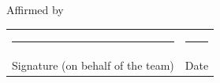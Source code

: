 \begin{center}
\begin{tcolorbox}[colback=white, colframe=black, boxrule=1pt, width=\textwidth, arc=5pt, auto outer arc, sharp corners=south]
    Affirmed by \textit{\StudentOneName} \\[2em]

    \hfill \begin{tabular}{ll}
        \rule{6cm}{0.4pt} & \rule{3cm}{0.4pt} \\
        Signature (on behalf of the team) & Date
    \end{tabular}
    \end{tcolorbox}
\end{center}

